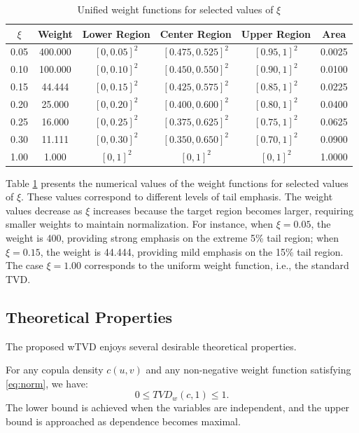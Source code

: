 \documentclass[twoside]{article}
\begin{document}
\begin{table}[!h]
\centering
\small
\caption{Unified weight functions for selected values of $\xi$}
\label{tab:unified_weights}
\begin{tabular}{|c|c|c|c|c|c|}
\hline
\textbf{$\xi$} & \textbf{Weight} & \textbf{Lower Region} & \textbf{Center Region} & \textbf{Upper Region} & \textbf{Area}  \\
\hline
0.05 & 400.000 & $[0,0.05]^2$ & $[0.475,0.525]^2$ & $[0.95,1]^2$ & 0.0025 \\
0.10 & 100.000 & $[0,0.10]^2$ & $[0.450,0.550]^2$ & $[0.90,1]^2$ & 0.0100\\
0.15 & 44.444 & $[0,0.15]^2$ & $[0.425,0.575]^2$ & $[0.85,1]^2$ & 0.0225  \\
0.20 & 25.000 & $[0,0.20]^2$ & $[0.400,0.600]^2$ & $[0.80,1]^2$ & 0.0400  \\
0.25 & 16.000 & $[0,0.25]^2$ & $[0.375,0.625]^2$ & $[0.75,1]^2$ & 0.0625  \\
0.30 & 11.111 & $[0,0.30]^2$ & $[0.350,0.650]^2$ & $[0.70,1]^2$ & 0.0900  \\
1.00 & 1.000 & $[0,1]^2$ & $[0,1]^2$ & $[0,1]^2$ & 1.0000  \\
\hline
\end{tabular}
\end{table}

Table \ref{tab:unified_weights} presents the numerical values of the weight functions for selected values of $\xi$. These values correspond to different levels of tail emphasis. The weight values decrease as $\xi$ increases because the target region becomes larger, requiring smaller weights to maintain normalization. For instance, when $\xi = 0.05$, the weight is 400, providing strong emphasis on the extreme 5\% tail region; when $\xi = 0.15$, the weight is 44.444, providing mild emphasis on the 15\% tail region. The case $\xi = 1.00$ corresponds to the uniform weight function, i.e., the standard TVD.

\subsection{Theoretical Properties}

The proposed wTVD enjoys several desirable theoretical properties.

\begin{pro}[Boundedness]\label{prop:boundedness}
For any copula density \( c(u,v) \) and any non-negative weight function satisfying \eqref{eq:norm}, we have:
\[
0 \leq TVD_w(c,1) \leq 1.
\]
The lower bound is achieved when the variables are independent, and the upper bound is approached as dependence becomes maximal.
\end{pro}
\end{document}
